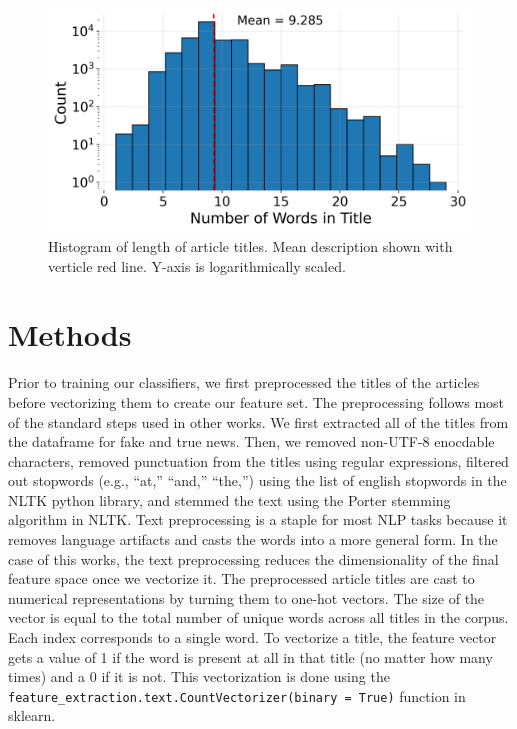 \documentclass[12pt]{article}
\begin{document}
    \begin{figure}[htbp]
        \centerline{\includegraphics[scale=1]{../results/length_of_description.png}}
        \caption{Histogram of length of article titles. Mean description shown with verticle red line. Y-axis is logarithmically scaled.}
        \label{fig:1}
\end{figure}	
	
	\section{Methods}
	
    Prior to training our classifiers, we first preprocessed the titles of the articles before vectorizing them to create our feature set. The preprocessing follows most of the standard steps used in other works\cite{oshikawa:2020}. We first extracted all of the titles from the dataframe for fake and true news. Then, we removed non-UTF-8 enocdable characters, removed punctuation from the titles using regular expressions, filtered out stopwords (e.g., ``at,'' ``and,'' ``the,'') using the list of english stopwords in the NLTK python library, and stemmed the text using the Porter stemming algorithm in NLTK. Text preprocessing is a staple for most NLP tasks because it removes language artifacts and casts the words into a more general form. In the case of this works, the text preprocessing reduces the dimensionality of the final feature space once we vectorize it. The preprocessed article titles are cast to numerical representations by turning them to one-hot vectors. The size of the vector is equal to the total number of unique words across all titles in the corpus. Each index corresponds to a single word. To vectorize a title, the feature vector gets a value of 1 if the word is present at all in that title (no matter how many times) and a 0 if it is not. This vectorization is done using the \texttt{feature\_extraction.text.CountVectorizer(binary = True)} function in sklearn. 
	
\end{document}
